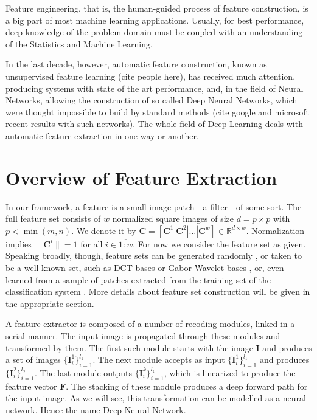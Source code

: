 \documentclass[12pt,a4paper,oneside,english]{UPBThesis}
\newcommand{\hctimes}[2]{{#1}\!\times\!{#2}}
\newcommand{\hcrange}[2]{\overline{{#1}\colon\!\!{#2}}}
\begin{document}
Feature engineering, that is, the human-guided process of feature construction, is a big part of most machine learning applications. Usually, for best performance, deep knowledge of the problem domain must be coupled with an understanding of the Statistics and Machine Learning.

In the last decade, however, automatic feature construction, known as unsupervised feature learning (cite people here), has received much attention, producing systems with state of the art performance, and, in the field of Neural Networks, allowing the construction of so called Deep Neural Networks, which were thought impossible to build by standard methods (cite google and microsoft recent results with such networks). The whole field of Deep Learning deals with automatic feature extraction in one way or another.

\chapter{Overview of Feature Extraction}

In our framework, a feature is a small image patch - a filter - of some sort. The full feature set consists of $w$ normalized square images of size $d = \hctimes{p}{p}$ with $p < \min(m,n)$. We denote it by $\textbf{C} = \left[ \textbf{C}^1 \left|\right. \textbf{C}^2 \left|\right. \dots \left|\right. \textbf{C}^w \right] \in \mathbb{R}^{\hctimes{d}{w}}$. Normalization implies $\|\mathbf{C}^i\| = 1$ for all $i \in \hcrange{1}{w}$. For now we consider the feature set as given. Speaking broadly, though, feature sets can be generated randomly \cite{random-weights-feature-learning}, or taken to be a well-known set, such as DCT bases or Gabor Wavelet bases \cite{simple-method-sparse-coding}, or, even learned from a sample of patches extracted from the training set of the classification system \cite{emergence-sparse-coding,sparse-coding-strategy-V1,tiny-images}. More details about feature set construction will be given in the appropriate section.

A feature extractor is composed of a number of recoding modules, linked in a serial manner. The input image is propagated through these modules and transformed by them. The first such module starts with the image $\textbf{I}$ and produces a set of images $\{\textbf{I}_i^1\}_{i=1}^{l_1}$. The next module accepts as input $\{\textbf{I}_i^1\}_{i=1}^{l_1}$ and produces $\{\textbf{I}_i^2\}_{i=1}^{l_2}$. The last module outputs $\{\textbf{I}_i^k\}_{i=1}^{l_k}$, which is linearized to produce the feature vector $\mathbf{F}$. The stacking of these module produces a deep forward path for the input image. As we will see, this transformation can be modelled as a neural network. Hence the name Deep Neural Network. 
\end{document}
